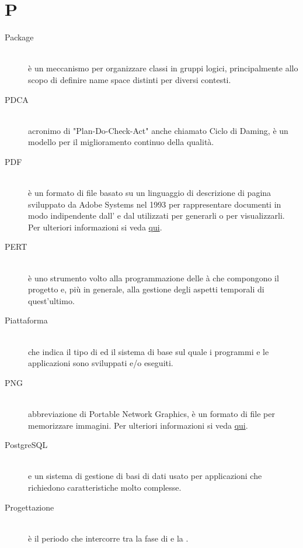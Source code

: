 \documentclass[12pt,a4paper]{article}
\begin{document}
\newpage

\section{P}

\begin{description}
\item[Package] 
\hfill\\è un meccanismo per organizzare classi  in gruppi logici, principalmente allo scopo di definire name space distinti per diversi contesti.

\item[PDCA] 
\hfill\\ acronimo di "Plan-Do-Check-Act" anche chiamato Ciclo di Daming, è un modello per il miglioramento continuo della qualità.

\item[PDF] 
\hfill\\ è un formato di file basato su un linguaggio di descrizione di pagina sviluppato da Adobe Systems nel 1993 per rappresentare documenti in modo indipendente dall’ e dal  utilizzati per generarli o per visualizzarli. Per ulteriori informazioni si veda \href{http://it.wikipedia.org/wiki/Portable_Document_Format}{qui}.

\item[PERT] 
\hfill\\ è uno strumento volto alla programmazione delle à che compongono il progetto e, più in generale, alla gestione degli aspetti temporali di quest'ultimo.

\item[Piattaforma] 
\hfill\\ che indica il tipo di  ed il sistema  di base sul quale i programmi e le applicazioni sono sviluppati e/o eseguiti.

\item[PNG] 
\hfill\\ abbreviazione di Portable Network Graphics, è un formato di file per memorizzare immagini. Per ulteriori informazioni si veda \href{http://it.wikipedia.org/wiki/Portable_Network_Graphics}{qui}.

\item[PostgreSQL] 
\hfill\\ e un sistema di gestione di basi di dati  usato per applicazioni che richiedono caratteristiche molto complesse.

\item[Progettazione] 
\hfill\\ è il periodo che intercorre tra la fase di \FAD e la \RP.


\end{description}
\end{document}
